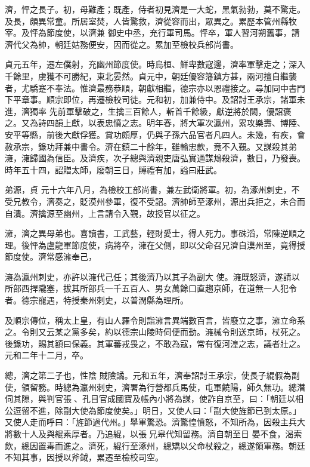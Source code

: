 \begin{pinyinscope}
 濟，怦之長子。初，母難產；既產，侍者初見濟是一大蛇，黑氣勃勃，莫不驚走。及長，頗異常童。所居室焚，人皆驚救，濟從容而出，眾異之。累歷本管州縣牧宰。及怦為節度使，以濟兼
 御史中丞，充行軍司馬。怦卒，軍人習河朔舊事，請濟代父為帥，朝廷姑務便安，因而從之。累加至檢校兵部尚書。



 貞元五年，遷左僕射，充幽州節度使。時烏桓、鮮卑數寇邊，濟率軍擊走之；深入千餘里，虜獲不可勝紀，東北晏然。貞元中，朝廷優容籓鎮方甚，兩河擅自繼襲者，尤驕蹇不奉法。惟濟最務恭順，朝獻相繼，德宗亦以恩禮接之。尋加同中書門下平章事。順宗即位，再遷檢校司徒。元和初，加兼侍中。及詔討王承宗，諸軍未進，濟獨率
 先前軍擊破之，生擒三百餘人，斬首千餘級，獻逆將於闕，優詔褒之。又為詩四韻上獻，以表忠憤之志。明年春，將大軍次瀛州，累攻樂壽、博陸、安平等縣，前後大獻俘獲。賞功頗厚，仍與子孫六品官者凡四人。未幾，有疾，會赦承宗，錄功拜兼中書令。濟在鎮二十餘年，雖輸忠款，竟不入覲。又謀殺其弟澭，澭歸國為信臣。及濟疾，次子總與濟親吏唐弘實通謀鴆殺濟，數日，乃發喪。時年五十四，詔贈太師，廢朝三日，賻禮有加，謚曰莊武。



 弟源，貞
 元十六年八月，為檢校工部尚書，兼左武衛將軍。初，為涿州刺史，不受兄教令，濟奏之，貶漠州參軍，復不受詔。濟帥師至涿州，源出兵拒之，未合而自潰。濟擒源至幽州，上言請令入覲，故授官以征之。



 澭，濟之異母弟也。喜讀書，工武藝，輕財愛士，得人死力。事硃滔，常陳逆順之理。後怦為盧龍軍節度使，病將卒，澭在父側，即以父命召兄濟自漠州至，竟得授節度使。濟常感澭奉己，



 澭為瀛州刺史，亦許以澭代己任；其後濟乃以其子為副大
 使。澭既怒濟，遂請以所部西捍隴塞，拔其所部兵一千五百人、男女萬餘口直趨京師，在道無一人犯令者。德宗寵遇，特授秦州刺史，以普潤縣為理所。



 及順宗傳位，稱太上皇，有山人羅令則詣澭言異端數百言，皆廢立之事，澭立命系之。令則又云某之黨多矣，約以德宗山陵時伺便而動。澭械令則送京師，杖死之。後錄功，賜其額曰保義。其軍蕃戎畏之，不敢為寇，常有復河湟之志，議者壯之。元和二年十二月，卒。



 總，濟之第二子也，性陰
 賊險譎。元和五年，濟奉詔討王承宗，使長子緄假為副使，領留務。時總為瀛州刺史，濟署為行營都兵馬使，屯軍饒陽，師久無功。總潛伺其隙，與判官張、孔目官成國寶及帳內小將為謀，使詐自京至，曰：「朝廷以相公逗留不進，除副大使為節度使矣。」明日，又使人曰：「副大使旌節已到太原。」又使人走而呼曰：「旌節過代州。」舉軍驚恐。濟驚惶憤怒，不知所為，因殺主兵大將數十人及與緄素厚者。乃追緄，以張兄皋代知留務。濟自朝至日
 晏不食，渴索飲，總因置毒而進之。濟死，緄行至涿州，總矯以父命杖殺之，總遂領軍務。朝廷不知其事，因授以斧鉞，累遷至檢校司空。




\end{pinyinscope}
